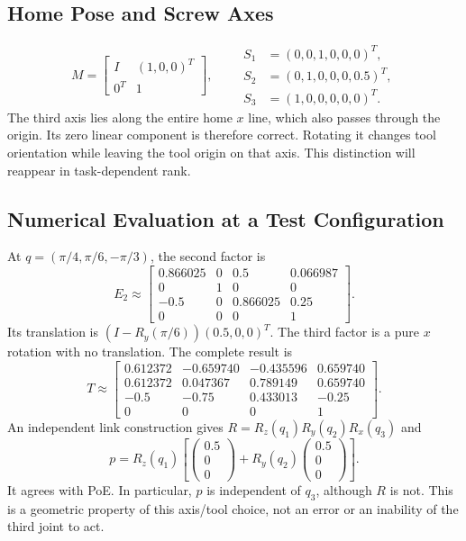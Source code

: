 \subsection{Home Pose and Screw Axes}
\label{subsec:home_config}
\label{subsec:spatial_screw_axes}
\begin{equation}
 M=\begin{bmatrix}I&(1,0,0)^T\\0^T&1\end{bmatrix},\qquad
 \begin{aligned}
 S_1&=(0,0,1,0,0,0)^T,\\
 S_2&=(0,1,0,0,0,0.5)^T,\\
 S_3&=(1,0,0,0,0,0)^T.
 \end{aligned}
\end{equation}
The third axis lies along the entire home $x$ line, which also passes through the origin. Its zero linear component is therefore correct. Rotating it changes tool orientation while leaving the tool origin on that axis. This distinction will reappear in task-dependent rank.

\subsection{Numerical Evaluation at a Test Configuration}
\label{subsec:spatial_3r_eval}

At $q=(\pi/4,\pi/6,-\pi/3)$, the second factor is
\begin{equation}
 E_2\approx\begin{bmatrix}
 0.866025&0&0.5&0.066987\\
 0&1&0&0\\
 -0.5&0&0.866025&0.25\\
 0&0&0&1
 \end{bmatrix}.
\end{equation}
Its translation is $(I-R_y(\pi/6))(0.5,0,0)^T$. The third factor is a pure $x$ rotation with no translation. The complete result is
\begin{equation}
 T\approx\begin{bmatrix}
 0.612372&-0.659740&-0.435596&0.659740\\
 0.612372&0.047367&0.789149&0.659740\\
 -0.5&-0.75&0.433013&-0.25\\
 0&0&0&1
 \end{bmatrix}.
\end{equation}
An independent link construction gives $R=R_z(q_1)R_y(q_2)R_x(q_3)$ and
\begin{equation}
 p=R_z(q_1)\left[
 \begin{pmatrix}0.5\\0\\0\end{pmatrix}
 +R_y(q_2)\begin{pmatrix}0.5\\0\\0\end{pmatrix}\right].
\end{equation}
It agrees with PoE. In particular, $p$ is independent of $q_3$, although $R$ is not. This is a geometric property of this axis/tool choice, not an error or an inability of the third joint to act.

